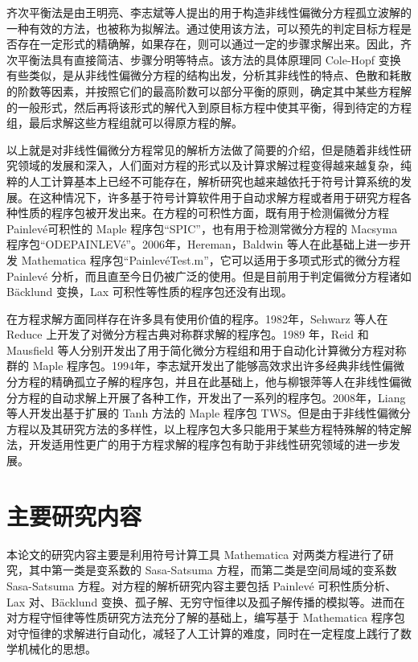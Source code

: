齐次平衡法是由王明亮、李志斌等人提出的用于构造非线性偏微分方程孤立波解的一种有效的方法，也被称为拟解法。通过使用该方法，可以预先的判定目标方程是否存在一定形式的精确解，如果存在，则可以通过一定的步骤求解出来。因此，齐次平衡法具有直接简洁、步骤分明等特点。该方法的具体原理同 Cole-Hopf 变换有些类似，是从非线性偏微分方程的结构出发，分析其非线性的特点、色散和耗散的阶数等因素，并按照它们的最高阶数可以部分平衡的原则，确定其中某些方程解的一般形式，然后再将该形式的解代入到原目标方程中使其平衡，得到待定的方程组，最后求解这些方程组就可以得原方程的解。

以上就是对非线性偏微分方程常见的解析方法做了简要的介绍，但是随着非线性研究领域的发展和深入，人们面对方程的形式以及计算求解过程变得越来越复杂，纯粹的人工计算基本上已经不可能存在，解析研究也越来越依托于符号计算系统的发展。在这种情况下，许多基于符号计算软件用于自动求解方程或者用于研究方程各种性质的程序包被开发出来。在方程的可积性方面，既有用于检测偏微分方程 Painlev\'{e}可积性的 Maple 程序包“SPIC”，也有用于检测常微分方程的  Macsyma 程序包“ODEPAINLEV\'{e}”。2006年，Hereman，Baldwin 等人在此基础上进一步开发  Mathematica 程序包“Painlev\'{e}Test.m”，它可以适用于多项式形式的微分方程 Painlev\'{e} 分析，而且直至今日仍被广泛的使用。但是目前用于判定偏微分方程诸如 B\"{a}cklund 变换，Lax 可积性等性质的程序包还没有出现。

在方程求解方面同样存在许多具有使用价值的程序。1982年，Sehwarz 等人在 Reduce 上开发了对微分方程古典对称群求解的程序包。1989 年，Reid 和 Mausfield 等人分别开发出了用于简化微分方程组和用于自动化计算微分方程对称群的  Maple 程序包。1994年，李志斌开发出了能够高效求出许多经典非线性偏微分方程的精确孤立子解的程序包，并且在此基础上，他与柳银萍等人在非线性偏微分方程的自动求解上开展了各种工作，开发出了一系列的程序包。2008年，Liang 等人开发出基于扩展的 Tanh 方法的 Maple 程序包 TWS。但是由于非线性偏微分方程以及其研究方法的多样性，以上程序包大多只能用于某些方程特殊解的特定解法，开发适用性更广的用于方程求解的程序包有助于非线性研究领域的进一步发展。

\section{主要研究内容}

本论文的研究内容主要是利用符号计算工具 Mathematica 对两类方程进行了研究，其中第一类是变系数的 Sasa-Satsuma 方程，而第二类是空间局域的变系数 Sasa-Satsuma 方程。对方程的解析研究内容主要包括  Painlev\'{e} 可积性质分析、Lax 对、B\"{a}cklund 变换、孤子解、无穷守恒律以及孤子解传播的模拟等。进而在对方程守恒律等性质研究方法充分了解的基础上，编写基于 Mathematica 程序包对守恒律的求解进行自动化，减轻了人工计算的难度，同时在一定程度上践行了数学机械化的思想。

